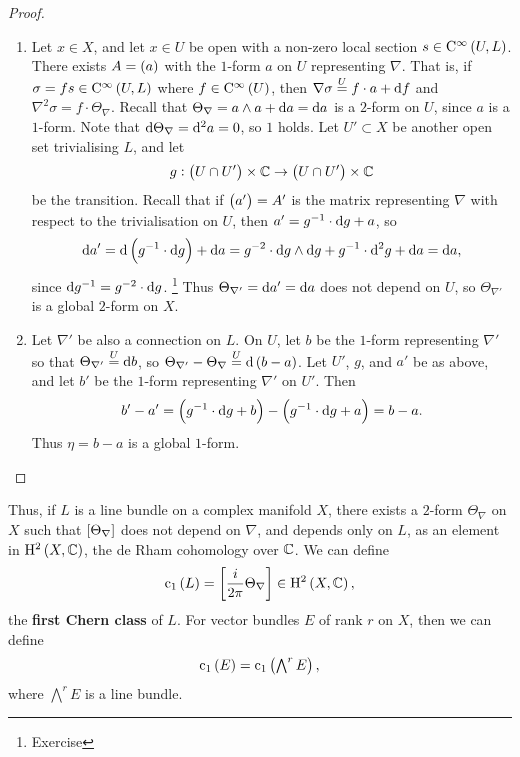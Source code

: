 \begin{proof}
\hfill
\begin{enumerate}
\item Let $ x \in X $, and let $ x \in U $ be open with a non-zero local section $ s \in \C^\infty\br{U, L} $. There exists $ A = \br{a} $ with the $ 1 $-form $ a $ on $ U $ representing $ \nabla $. That is, if $ \sigma = fs \in \C^\infty\br{U, L} $ where $ f \in \C^\infty\br{U} $, then $ \nabla\sigma \overset{U}{=} f \cdot a + \mathrm{d} f $ and $ \nabla^2\sigma = f \cdot \Theta_\nabla $. Recall that $ \Theta_\nabla = a \wedge a + \mathrm{d} a = \mathrm{d} a $ is a $ 2 $-form on $ U $, since $ a $ is a $ 1 $-form. Note that $ \mathrm{d}\Theta_\nabla = \mathrm{d}^2a = 0 $, so $ 1 $ holds. Let $ U' \subset X $ be another open set trivialising $ L $, and let
$$ g : \br{U \cap U'} \times \CC \to \br{U \cap U'} \times \CC $$
be the transition. Recall that if $ \br{a'} = A' $ is the matrix representing $ \nabla $ with respect to the trivialisation on $ U $, then $ a' = g^{-1} \cdot \mathrm{d} g + a $, so
$$ \d a' = \d\br{g^{-1} \cdot \d g} + \d a = g^{-2} \cdot \d g \wedge \d g + g^{-1} \cdot \d^2g + \d a = \d a, $$
since $ \mathrm{d} g^{-1} = g^{-2} \cdot \mathrm{d} g $. \footnote{Exercise} Thus $ \Theta_{\nabla'} = \mathrm{d} a' = \mathrm{d} a $ does not depend on $ U $, so $ \Theta_{\nabla'} $ is a global $ 2 $-form on $ X $.


\item Let $ \nabla' $ be also a connection on $ L $. On $ U $, let $ b $ be the $ 1 $-form representing $ \nabla' $ so that $ \Theta_{\nabla'} \overset{U}{=} \mathrm{d} b $, so $ \Theta_{\nabla'} - \Theta_\nabla \overset{U}{=} \d\br{b - a} $. Let $ U' $, $ g $, and $ a' $ be as above, and let $ b' $ be the $ 1 $-form representing $ \nabla' $ on $ U' $. Then
$$ b' - a' = \br{g^{-1} \cdot \d g + b} - \br{g^{-1} \cdot \d g + a} = b - a. $$
Thus $ \eta = b - a $ is a global $ 1 $-form.
\end{enumerate}
\end{proof}

\pagebreak

\begin{remark}
Thus, if $ L $ is a line bundle on a complex manifold $ X $, there exists a $ 2 $-form $ \Theta_\nabla $ on $ X $ such that $ \sbr{\Theta_\nabla} $ does not depend on $ \nabla $, and depends only on $ L $, as an element in $ \H^2\br{X, \CC} $, the de Rham cohomology over $ \mathbb{C} $. We can define
$$ \c_1\br{L} = \sbr{\dfrac{i}{2\pi}\Theta_\nabla} \in \H^2\br{X, \CC}, $$
the \textbf{first Chern class} of $ L $. For vector bundles $ E $ of rank $ r $ on $ X $, then we can define
$$ \c_1\br{E} = \c_1\br{\textstyle\bigwedge^rE}, $$
where $ \bigwedge^rE $ is a line bundle.
\end{remark}

